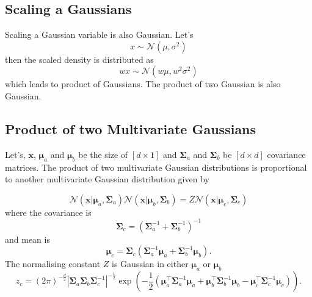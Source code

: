 \subsection{Scaling a Gaussians}
Scaling a Gaussian variable is also Gaussian. Let's
\begin{equation}\label{eq:Gaussian_density_sc}
 x\sim\mathcal{N}\left(\mu,\sigma^{2}\right)
\end{equation}
then the scaled density is distributed as
\begin{equation}\label{eq:Gaussian_density_sc}
 wx\sim\mathcal{N}\left(w\mu,w^2\sigma^{2}\right)
\end{equation}
which leads to product of Gaussians. The product of two Gaussian is also Gaussian.

\subsection{Product of two Multivariate Gaussians} \label{app_mul_GP}
Let's, $\textbf{x}$, $\boldsymbol{\mu}_a$ and $\boldsymbol{\mu}_b$ be the size of $\left[d\times 1 \right]$ and $\boldsymbol{\Sigma}_a$ and $\boldsymbol{\Sigma}_b$ be  $\left[d\times d \right]$ covariance matrices. The product of two multivariate Gaussian distributions is proportional to another multivariate  Gaussian distribution given by

\begin{equation}\label{eq:app_products}
\mathcal{N}\left(\textbf{x}|\boldsymbol{\mu}_a,\boldsymbol{\Sigma}_a\right) \mathcal{N}\left(\textbf{x}|\boldsymbol{\mu}_b,\boldsymbol{\Sigma}_b\right)=
Z\mathcal{N}\left(\textbf{x}|\boldsymbol{\mu}_c,\boldsymbol{\Sigma}_c\right)
\end{equation}
where the covariance is
\begin{equation}\label{eq:app_products_cov}
\boldsymbol{\Sigma}_c = \left(\boldsymbol{\Sigma}_a^{-1}+\boldsymbol{\Sigma}_b^{-1}\right)^{-1}
\end{equation}
and mean is 
\begin{equation}\label{eq:app_products_mean}
\boldsymbol{\mu}_c = \boldsymbol{\Sigma}_c \left(\boldsymbol{\Sigma}_a^{-1}\boldsymbol{\mu}_a+\boldsymbol{\Sigma}_b^{-1}\boldsymbol{\mu}_b\right).
\end{equation}
The normalising constant $Z$ is Gaussian in either $\boldsymbol{\mu}_a$ or $\boldsymbol{\mu}_b$ 
\begin{equation}\label{eq:app_products_const}
z_c=\left(2\pi\right)^{-\frac{d}{2}}|\boldsymbol{\Sigma}_a\boldsymbol{\Sigma}_b\boldsymbol{\Sigma}_c^{-1}|^{-\frac{1}{2}}\exp\left(-\frac{1}{2}\left(\boldsymbol{\mu}_a^\top\boldsymbol{\Sigma}_a^{-1}\boldsymbol{\mu}_a+\boldsymbol{\mu}_b^\top\boldsymbol{\Sigma}_b^{-1}\boldsymbol{\mu}_b-\boldsymbol{\mu}_c^\top\boldsymbol{\Sigma}_c^{-1}\boldsymbol{\mu}_c\right)\right).
\end{equation}

